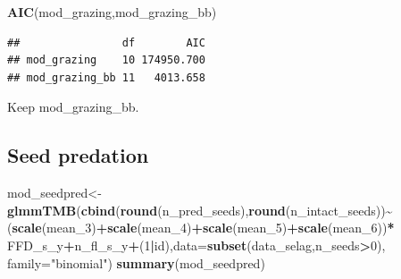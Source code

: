 \documentclass[
]{article}
\newenvironment{Shaded}{\begin{snugshade}}{\end{snugshade}}
\newcommand{\DataTypeTok}[1]{\textcolor[rgb]{0.13,0.29,0.53}{#1}}
\newcommand{\DecValTok}[1]{\textcolor[rgb]{0.00,0.00,0.81}{#1}}
\newcommand{\KeywordTok}[1]{\textcolor[rgb]{0.13,0.29,0.53}{\textbf{#1}}}
\newcommand{\NormalTok}[1]{#1}
\newcommand{\OperatorTok}[1]{\textcolor[rgb]{0.81,0.36,0.00}{\textbf{#1}}}
\newcommand{\StringTok}[1]{\textcolor[rgb]{0.31,0.60,0.02}{#1}}
\begin{document}
\begin{Shaded}
\begin{Highlighting}[]
\KeywordTok{AIC}\NormalTok{(mod\_grazing,mod\_grazing\_bb)}
\end{Highlighting}
\end{Shaded}

\begin{verbatim}
##                df        AIC
## mod_grazing    10 174950.700
## mod_grazing_bb 11   4013.658
\end{verbatim}

Keep mod\_grazing\_bb.

\hypertarget{seed-predation}{%
\subsection{Seed predation}\label{seed-predation}}

\begin{Shaded}
\begin{Highlighting}[]
\NormalTok{mod\_seedpred\textless{}{-}}\KeywordTok{glmmTMB}\NormalTok{(}\KeywordTok{cbind}\NormalTok{(}\KeywordTok{round}\NormalTok{(n\_pred\_seeds),}\KeywordTok{round}\NormalTok{(n\_intact\_seeds))}\OperatorTok{\textasciitilde{}}
\StringTok{                     }\NormalTok{(}\KeywordTok{scale}\NormalTok{(mean\_}\DecValTok{3}\NormalTok{)}\OperatorTok{+}\KeywordTok{scale}\NormalTok{(mean\_}\DecValTok{4}\NormalTok{)}\OperatorTok{+}\KeywordTok{scale}\NormalTok{(mean\_}\DecValTok{5}\NormalTok{)}\OperatorTok{+}\KeywordTok{scale}\NormalTok{(mean\_}\DecValTok{6}\NormalTok{))}\OperatorTok{*}
\StringTok{                      }\NormalTok{FFD\_s\_y}\OperatorTok{+}\NormalTok{n\_fl\_s\_y}\OperatorTok{+}\NormalTok{(}\DecValTok{1}\OperatorTok{|}\NormalTok{id),}\DataTypeTok{data=}\KeywordTok{subset}\NormalTok{(data\_selag,n\_seeds}\OperatorTok{\textgreater{}}\DecValTok{0}\NormalTok{),}
                    \DataTypeTok{family=}\StringTok{"binomial"}\NormalTok{)}
\KeywordTok{summary}\NormalTok{(mod\_seedpred)}
\end{Highlighting}
\end{Shaded}
\end{document}
